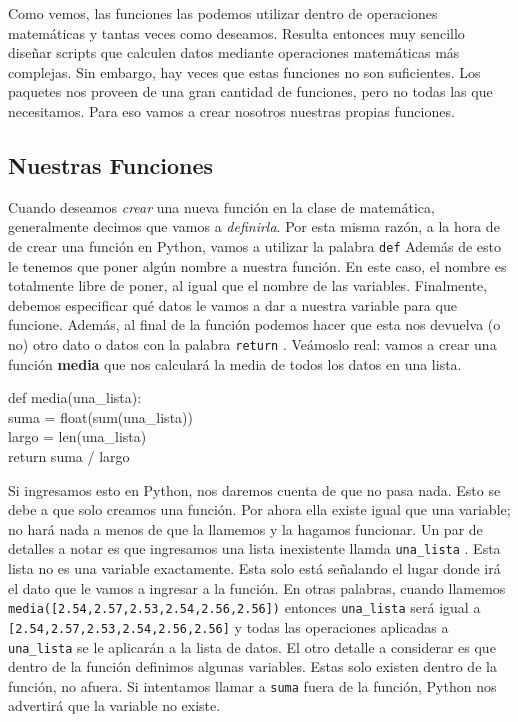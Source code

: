 \documentclass[10pt,letterpaper]{article}
\newcommand{\inlinecode}[1]{
\colorbox{light-gray}{\texttt{#1}}
}
\newenvironment{Code}
{
\begin{lrbox}{\selvestebox}%
\begin{minipage}{\dimexpr\columnwidth-2\fboxsep\relax}
\fontfamily{\ttdefault}\selectfont
}
{\end{minipage}\end{lrbox}%
\begin{center}
\colorbox{light-gray}{\usebox{\selvestebox}}
\end{center}
}
\begin{document}
Como vemos, las funciones las podemos utilizar dentro de operaciones matem\'aticas y tantas veces como deseamos. Resulta entonces muy sencillo dise\~nar scripts que calculen datos mediante operaciones matem\'aticas m\'as complejas. Sin embargo, hay veces que estas funciones no son suficientes. Los paquetes nos proveen de una gran cantidad de funciones, pero no todas las que necesitamos. Para eso vamos a crear nosotros nuestras propias funciones.

\subsection{Nuestras Funciones}
Cuando deseamos \emph{crear} una nueva funci\'on en la clase de matem\'atica, generalmente decimos que vamos a \emph{definirla}. Por esta misma raz\'on, a la hora de de crear una funci\'on en Python, vamos a utilizar la palabra \inlinecode{def} Adem\'as de esto le tenemos que poner alg\'un nombre a nuestra funci\'on. En este caso, el nombre es totalmente libre de poner, al igual que el nombre de las variables. Finalmente, debemos especificar qu\'e datos le vamos a dar a nuestra variable para que funcione. Adem\'as, al final de la funci\'on podemos hacer que esta nos devuelva (o no) otro dato o datos con la palabra \inlinecode{return}. Ve\'amoslo real: vamos a crear una funci\'on \textbf{media} que nos calcular\'a la media de todos los datos en una lista.

\begin{Code}
def media(una\_lista):\\
\hspace*{4mm} suma = float(sum(una\_lista))\\
\hspace*{4mm} largo = len(una\_lista)\\
\hspace*{4mm} return suma / largo
\end{Code}

Si ingresamos esto en Python, nos daremos cuenta de que no pasa nada. Esto se debe a que solo creamos una funci\'on. Por ahora ella existe igual que una variable; no har\'a nada a menos de que la llamemos y la hagamos funcionar. Un par de detalles a notar es que ingresamos una lista inexistente llamda \inlinecode{una\_lista}. Esta lista no es una variable exactamente. Esta solo est\'a se\~nalando el lugar donde ir\'a el dato que le vamos a ingresar a la funci\'on. En otras palabras, cuando llamemos \inlinecode{media([2.54,2.57,2.53,2.54,2.56,2.56])} entonces \inlinecode{una\_lista} ser\'a igual a \inlinecode{[2.54,2.57,2.53,2.54,2.56,2.56]} y todas las operaciones aplicadas a \inlinecode{una\_lista} se le aplicar\'an a la lista de datos. El otro detalle a considerar es que dentro de la funci\'on definimos algunas variables. Estas solo existen dentro de la funci\'on, no afuera. Si intentamos llamar a \inlinecode{suma} fuera de la funci\'on, Python nos advertir\'a que la variable no existe.\\
\end{document}
